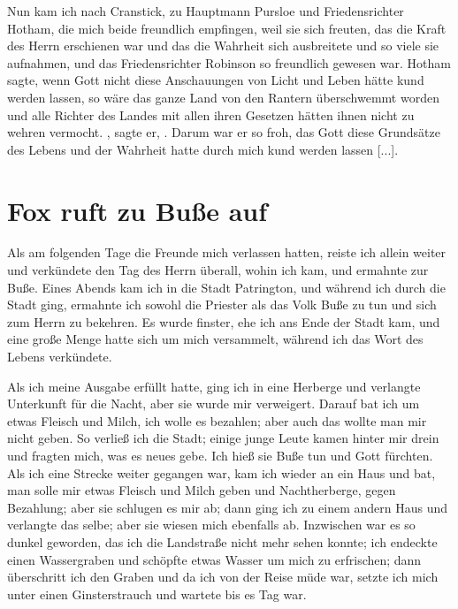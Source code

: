 Nun kam ich nach Cranstick, zu 
Hauptmann Pursloe und
Friedensrichter Hotham, 
die mich beide freundlich empfingen, weil
sie sich freuten, das die Kraft des Herrn erschienen war und das
die Wahrheit sich ausbreitete und so viele sie aufnahmen, und das
Friedensrichter Robinson 
so freundlich gewesen war. Hotham
sagte, wenn Gott nicht diese Anschauungen von Licht und Leben
hätte kund werden lassen, so wäre das ganze Land von den
Rantern überschwemmt worden und 
alle Richter des Landes mit
allen ihren Gesetzen hätten ihnen nicht zu wehren 
vermocht. ,
sagte er, .
Darum war er so froh, das Gott diese Grundsätze des Lebens
und der Wahrheit hatte durch mich kund werden lassen [...].

\section{Fox ruft zu Buße auf}

Als am folgenden Tage die Freunde mich verlassen hatten,
reiste ich allein weiter und verkündete den Tag des Herrn überall,
wohin ich kam, und ermahnte zur Buße. Eines Abends kam ich
in die Stadt Patrington, und während ich 
durch die Stadt ging,
ermahnte ich sowohl die Priester als das Volk 
Buße zu tun und
sich zum Herrn zu bekehren. Es wurde finster, ehe ich ans Ende
der Stadt kam, und eine große Menge hatte sich um mich 
versammelt, während ich das Wort des Lebens verkündete. 

Als ich meine Ausgabe erfüllt hatte, ging ich in eine Herberge und
verlangte Unterkunft für die Nacht, aber sie wurde mir verweigert.
Darauf bat ich um etwas Fleisch und Milch, ich wolle es bezahlen;
aber auch das wollte man mir nicht geben. So verließ ich die
Stadt; einige junge Leute kamen hinter mir drein und fragten
mich, was es neues gebe. Ich hieß sie Buße tun und Gott
fürchten. Als ich eine Strecke weiter gegangen war, kam ich wieder
an ein Haus und bat, man solle mir etwas Fleisch und Milch
geben und Nachtherberge, gegen Bezahlung; aber sie schlugen es
mir ab; dann ging ich zu einem andern Haus und verlangte das
selbe; aber sie wiesen mich ebenfalls ab. Inzwischen war es so
dunkel geworden, das ich die Landstraße nicht mehr sehen konnte;
ich endeckte einen Wassergraben und schöpfte etwas Wasser um
mich zu erfrischen; dann überschritt ich den Graben und da ich
von der Reise müde war, setzte ich mich unter einen Ginsterstrauch
und wartete bis es Tag war. 

